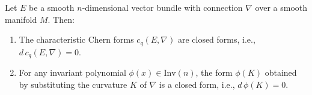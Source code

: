Let $E$ be a smooth $n$-dimensional vector bundle with connection $\nabla$ over a smooth manifold $M$. Then:
\begin{enumerate}
\item The characteristic Chern forms $c_q(E, \nabla)$ are closed forms, i.e., $d\,c_q(E, \nabla) = 0$.
\item For any invariant polynomial $\phi(x) \in \text{Inv}(n)$, the form $\phi(K)$ obtained by substituting the curvature $K$ of $\nabla$ is a closed form, i.e., $d\,\phi(K) = 0$.
\end{enumerate}
